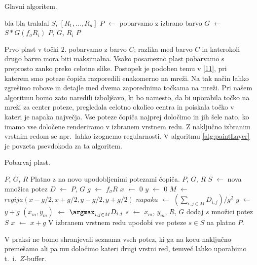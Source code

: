 \begin{algorithm}[htb]
  \caption{Glavni algoritem.}
  \label{alg:paintOsnovni}
\begin{algorithmic}[1]
\Require bla bla
\Ensure tralalal
 {$S$, $[R_1, \ldots, R_n]$}
  \State $P$ $\leftarrow$ pobarvamo z izbrano barvo
    \State $G$ $\leftarrow$ $S \ast G(f_{\sigma} R_i)$
    \State {} {$P$, $G$, $R_i$}
  \EndFor
  \State \Return $P$
\EndFunction
\end{algorithmic}
\end{algorithm}
%
Prvo plast v točki $2.$ pobarvamo z barvo $C$; razlika med barvo $C$ in katerokoli drugo barvo mora biti maksimalna. Vsako posamezno plast pobarvamo s preprosto zanko preko celotne slike. Postopek je podoben temu v \ref{11}, pri katerem smo poteze čopiča razporedili enakomerno na mreži. Na tak način lahko zgrešimo robove in detajle med dvema zaporednima točkama na mreži. Pri našem algoritmu bomo zato naredili izboljšavo, ki bo namesto, da bi uporabila točko na mreži za center poteze, pregledala celotno okolico centra in poiskala točko v kateri je napaka največja. Vse poteze čopiča najprej določimo in jih šele nato, ko imamo vse določene renderiramo v izbranem vrstnem redu. Z naključno izbranim vrstnim redom se npr.\ lahko izognemo regularnosti. V algoritmu \ref{alg:paintLayer} je povzeta psevdokoda za ta algoritem.

\begin{algorithm}[htb]
  \caption{Pobarvaj plast.}
  \label{alg:paintLayer}
\begin{algorithmic}[1]
\Require $P$, $G$, $R$
\Ensure Platno z na novo upodobljenimi potezami čopiča.
 {$P$, $G$, $R$}
  \State $S$ $\leftarrow$ nova množica potez
  \State $D$ $\leftarrow$  {$P$, $G$}
  \State $g$ $\leftarrow$ $f_{\sigma} R$
  \State $x$ $\leftarrow$ $0$
    \State $y$ $\leftarrow$ $0$
      \State $M$ $\leftarrow$ $regija(x - g/2, x + g/2, y - g/2, y + g/2)$
      \State $napaka$ $\leftarrow$ ${(\sum_{i, j \in M} D_{i, j})}/{g^2}$
      \State $y$ $\leftarrow$ $y + g$
        \State $(x_m, y_m)$ $\leftarrow$ $\argmax_{i, j \in M} D_{i, j}$
        \State $s$ $\leftarrow$  {$x_m$, $y_m$, $R$, $G$}
        \State dodaj $s$ množici potez $S$
      \EndIf
    \EndWhile
    \State $x$ $\leftarrow$ $x + g$
  \EndWhile
  \State V izbranem vrstnem redu upodobi vse poteze $s \in S$ na platno $P$.
\EndFunction
\end{algorithmic}
\end{algorithm}
%
V praksi ne bomo shranjevali seznama vseh potez, ki ga na kocu naključno premešamo ali pa mu določimo kateri drugi vrstni red, temveč lahko uporabimo t.\ i.\ $Z$-buffer. %
